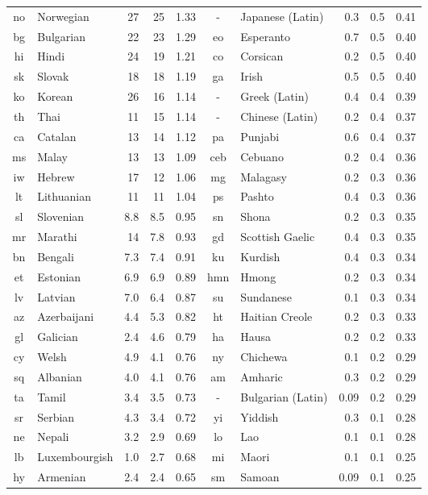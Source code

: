 \documentclass[11pt]{article}
\begin{document}
\begin{table*}[h!]
\begin{center}
\begin{tabular}[b]{clrrr|clrrr}
no & Norwegian & 27 & 25 & 1.33 & - & Japanese (Latin) & 0.3 & 0.5 & 0.41 \\
bg & Bulgarian & 22 & 23 & 1.29 & eo & Esperanto & 0.7 & 0.5 & 0.40 \\
hi & Hindi & 24 & 19 & 1.21 & co & Corsican & 0.2 & 0.5 & 0.40 \\
sk & Slovak & 18 & 18 & 1.19 & ga & Irish & 0.5 & 0.5 & 0.40 \\
ko & Korean & 26 & 16 & 1.14 & - & Greek (Latin) & 0.4 & 0.4 & 0.39 \\
th & Thai & 11 & 15 & 1.14 & - & Chinese (Latin) & 0.2 & 0.4 & 0.37 \\
ca & Catalan & 13 & 14 & 1.12 & pa & Punjabi & 0.6 & 0.4 & 0.37 \\
ms & Malay & 13 & 13 & 1.09 & ceb & Cebuano & 0.2 & 0.4 & 0.36 \\
iw & Hebrew & 17 & 12 & 1.06 & mg & Malagasy & 0.2 & 0.3 & 0.36 \\
lt & Lithuanian & 11 & 11 & 1.04 & ps & Pashto & 0.4 & 0.3 & 0.36 \\
sl & Slovenian & 8.8 & 8.5 & 0.95 & sn & Shona & 0.2 & 0.3 & 0.35 \\
mr & Marathi & 14 & 7.8 & 0.93 & gd & Scottish Gaelic & 0.4 & 0.3 & 0.35 \\
bn & Bengali & 7.3 & 7.4 & 0.91 & ku & Kurdish & 0.4 & 0.3 & 0.34 \\
et & Estonian & 6.9 & 6.9 & 0.89 & hmn & Hmong & 0.2 & 0.3 & 0.34 \\
lv & Latvian & 7.0 & 6.4 & 0.87 & su & Sundanese & 0.1 & 0.3 & 0.34 \\
az & Azerbaijani & 4.4 & 5.3 & 0.82 & ht & Haitian Creole & 0.2 & 0.3 & 0.33 \\
gl & Galician & 2.4 & 4.6 & 0.79 & ha & Hausa & 0.2 & 0.2 & 0.33 \\
cy & Welsh & 4.9 & 4.1 & 0.76 & ny & Chichewa & 0.1 & 0.2 & 0.29 \\
sq & Albanian & 4.0 & 4.1 & 0.76 & am & Amharic & 0.3 & 0.2 & 0.29 \\
ta & Tamil & 3.4 & 3.5 & 0.73 & - & Bulgarian (Latin) & 0.09 & 0.2 & 0.29 \\
sr & Serbian & 4.3 & 3.4 & 0.72 & yi & Yiddish & 0.3 & 0.1 & 0.28 \\
ne & Nepali & 3.2 & 2.9 & 0.69 & lo & Lao & 0.1 & 0.1 & 0.28 \\
lb & Luxembourgish & 1.0 & 2.7 & 0.68 & mi & Maori & 0.1 & 0.1 & 0.25 \\
hy & Armenian & 2.4 & 2.4 & 0.65 & sm & Samoan & 0.09 & 0.1 & 0.25 \\

\end{tabular}
\end{center}
\end{table*}
\end{document}
